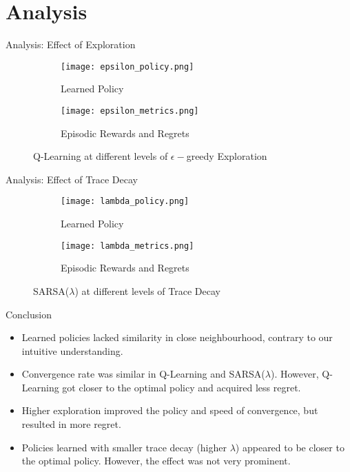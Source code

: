 \section{Analysis}

\begin{frame}{Analysis: Effect of Exploration}
\begin{figure}
    \centering
    \begin{subfigure}{\textwidth}
        \centering
        \texttt{[image: epsilon\_policy.png]}
        \caption{Learned Policy}
    \end{subfigure}
    \begin{subfigure}{\textwidth}
        \centering
        \texttt{[image: epsilon\_metrics.png]}
        \caption{Episodic Rewards and Regrets}
    \end{subfigure}
    \caption{Q-Learning at different levels of $\epsilon-$greedy Exploration}
\end{figure}
\end{frame}

\begin{frame}{Analysis: Effect of Trace Decay}
\begin{figure}
    \centering
    \begin{subfigure}{\textwidth}
        \centering
        \texttt{[image: lambda\_policy.png]}
        \caption{Learned Policy}
    \end{subfigure}
    \begin{subfigure}{\textwidth}
        \centering
        \texttt{[image: lambda\_metrics.png]}
        \caption{Episodic Rewards and Regrets}
    \end{subfigure}
    \caption{SARSA($\lambda$) at different levels of Trace Decay}
\end{figure}
\end{frame}

\begin{frame}{Conclusion}
\begin{itemize}
    \setlength\itemsep{1.5em}
    \item Learned policies lacked similarity in close neighbourhood, contrary to our intuitive understanding.
    \item Convergence rate was similar in Q-Learning and SARSA($\lambda$). However, Q-Learning got closer to the optimal policy and acquired less regret.
    \item Higher exploration improved the policy and speed of convergence, but resulted in more regret.
    \item Policies learned with smaller trace decay (higher $\lambda$) appeared to be closer to the optimal policy. However, the effect was not very prominent.
\end{itemize}
\end{frame}
